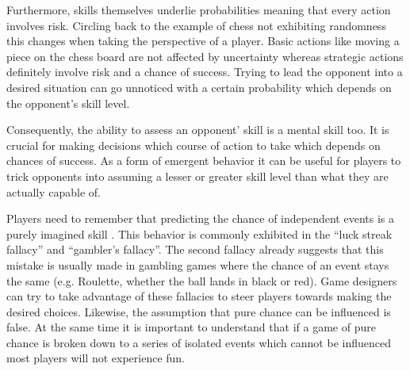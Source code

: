 Furthermore, skills themselves underlie probabilities meaning that every action involves risk.
Circling back to the example of chess not exhibiting randomness this changes when taking the perspective of a player.
Basic actions like moving a piece on the chess board are not affected by uncertainty whereas strategic actions definitely involve risk and a chance of success.
Trying to lead the opponent into a desired situation can go unnoticed with a certain probability which depends on the opponent's skill level.

Consequently, the ability to assess an opponent' skill is a mental skill too.
It is crucial for making decisions which course of action to take which depends on chances of success.
As a form of emergent behavior it can be useful for players to trick opponents into assuming a lesser or greater skill level than what they are actually capable of.

Players need to remember that predicting the chance of independent events is a purely imagined skill \cite{Schell2014}.
This behavior is commonly exhibited in the ``luck streak fallacy'' and ``gambler's fallacy''.
The second fallacy already suggests that this mistake is usually made in gambling games where the chance of an event stays the same (e.g. Roulette, whether the ball lands in black or red).
Game designers can try to take advantage of these fallacies to steer players towards making the desired choices.
Likewise, the assumption that pure chance can be influenced is false.
At the same time it is important to understand that if a game of pure chance is broken down to a series of isolated events which cannot be influenced most players will not experience fun.